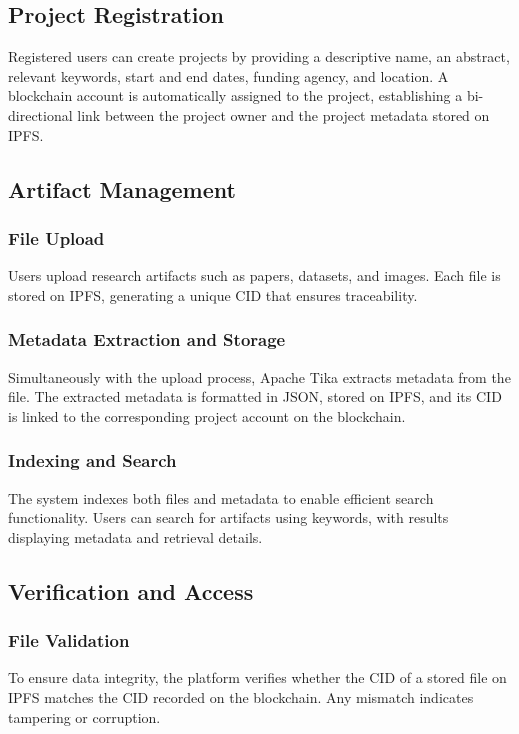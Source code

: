 \documentclass{article}
\begin{document}
\subsection{Project Registration}
Registered users can create projects by providing a descriptive name, an abstract, relevant keywords, start and end dates, funding agency, and location. A blockchain account is automatically assigned to the project, establishing a bi-directional link between the project owner and the project metadata stored on IPFS.

\subsection{Artifact Management}
\subsubsection{File Upload}
Users upload research artifacts such as papers, datasets, and images. Each file is stored on IPFS, generating a unique CID that ensures traceability.

\subsubsection{Metadata Extraction and Storage}
Simultaneously with the upload process, Apache Tika extracts metadata from the file. The extracted metadata is formatted in JSON, stored on IPFS, and its CID is linked to the corresponding project account on the blockchain.

\subsubsection{Indexing and Search}
The system indexes both files and metadata to enable efficient search functionality. Users can search for artifacts using keywords, with results displaying metadata and retrieval details.

\subsection{Verification and Access}
\subsubsection{File Validation}
To ensure data integrity, the platform verifies whether the CID of a stored file on IPFS matches the CID recorded on the blockchain. Any mismatch indicates tampering or corruption.
\end{document}
